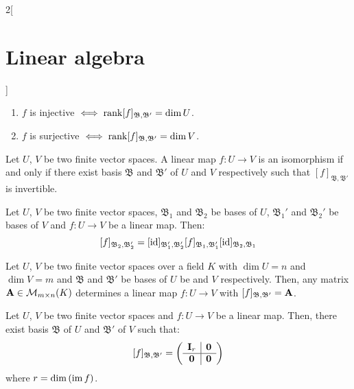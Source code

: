 \documentclass[../../../main.tex]{subfiles}
\begin{document}
\begin{multicols}{2}[\section{Linear algebra}]
\begin{corollary}
        \begin{enumerate}
            \item $f$ is injective $\iff\rank[f]_{\mathfrak{B},\mathfrak{B}'}=\dim U$.
            \item $f$ is surjective $\iff\rank[f]_{\mathfrak{B},\mathfrak{B}'}=\dim V$.
        \end{enumerate}
    \end{corollary}
    \begin{corollary}
        Let $U$, $V$ be two finite vector spaces. A linear map $f:U\rightarrow V$ is an isomorphism if and only if there exist basis $\mathfrak{B}$ and $\mathfrak{B}'$ of $U$ and $V$ respectively such that $[f]_{\mathfrak{B},\mathfrak{B}'}$ is invertible.
    \end{corollary}
    \begin{prop}
        Let $U$, $V$ be two finite vector spaces, $\mathfrak{B}_1$ and $\mathfrak{B}_2$ be bases of $U$, $\mathfrak{B}_1'$ and $\mathfrak{B}_2'$ be bases of $V$ and $f:U\rightarrow V$ be a linear map. Then: $$[f]_{\mathfrak{B}_2,\mathfrak{B}_2'}=[\mathrm{id}]_{\mathfrak{B}_1',\mathfrak{B}_2'}[f]_{\mathfrak{B}_1,\mathfrak{B}_1'}[\mathrm{id}]_{\mathfrak{B}_2,\mathfrak{B}_1}$$
    \end{prop}
    \begin{lemma}
        Let $U$, $V$ be two finite vector spaces over a field $K$ with $\dim U=n$ and $\dim V=m$ and $\mathfrak{B}$ and $\mathfrak{B}'$ be bases of $U$ be and $V$ respectively. Then, any matrix $\boldsymbol{\mathrm{A}}\in\mathcal{M}_{m\times n}(K)$ determines a linear map $f:U\rightarrow V$ with $[f]_{\mathfrak{B},\mathfrak{B}'}=\boldsymbol{\mathrm{A}}$.
    \end{lemma}
    \begin{theorem}
        Let $U$, $V$ be two finite vector spaces and $f:U\rightarrow V$ be a linear map. Then, there exist basis $\mathfrak{B}$ of $U$ and $\mathfrak{B}'$ of $V$ such that:
        $$[f]_{\mathfrak{B},\mathfrak{B}'}=\left(
            \begin{array}{c|c}
                    \boldsymbol{\mathrm{I}}_r & \boldsymbol{\mathrm{0}} \\
                    \hline
                    \boldsymbol{\mathrm{0}}   & \boldsymbol{\mathrm{0}}
                \end{array}\right)$$
        where $r=\dim\left(\operatorname{im} f\right)$.
    \end{theorem}

\end{multicols}
\end{document}
